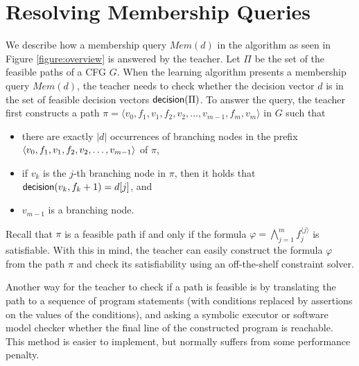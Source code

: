 \chapter{Resolving Membership Queries}\label{ch:mem}

We describe how a membership query $Mem(d)$ in the algorithm as seen in Figure \ref{figure:overview} is answered by the teacher. Let $\Pi$ be the set of the feasible paths of a CFG $G$. When the learning algorithm presents a membership query $Mem(d)$, the teacher needs to check whether the decision vector $d$ is in the set of feasible decision vectors $\mathsf{decision}(\Pi)$. To answer the query, the teacher first constructs a path $\pi = \langle v_0, f_1, v_1, f_2, v_2, \dots,  v_{m-1}, f_m, v_m \rangle$ in $G$ such that
\begin{itemize}
	\item there are exactly $|d|$ occurrences of branching nodes in the prefix $\langle v_0, f_1, v_1, f_2, v_2, \dots, \\  v_{m-1} \rangle$ of $\pi$,
	\item if $v_k$ is the $j$-th branching node in $\pi$, then it holds that $\mathsf{decision}(v_k, f_k+1) = d[j]$, and
	\item $v_{m-1}$ is a branching node.
\end{itemize}
Recall that $\pi$ is a feasible path if and only if the formula $\varphi = \bigwedge_{j=1}^m f_j^{\langle j \rangle}$ is satisfiable. With this in mind, the teacher can easily construct the formula $\varphi$ from the path $\pi$ and check its satisfiability using an off-the-shelf constraint solver. 

Another way for the teacher to check if a path is feasible is by translating the path to a sequence of program statements (with conditions replaced by assertions on the values of the conditions), and asking a symbolic executor or software model checker whether the final line of the constructed program is reachable. This method is easier to implement, but normally suffers from some performance penalty. 